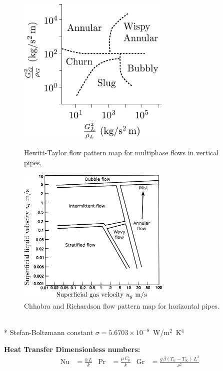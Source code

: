 \begin{datasheet}
\begin{figure}[p!]%
  \begin{center}%
    \includegraphics[width=0.65\textwidth,clip]{figures/Hewitt_Taylor}
  \end{center}
  \caption{Hewitt-Taylor flow pattern map for multiphase flows in
    vertical pipes.}
  \begin{center}%
    \includegraphics[width=0.65\textwidth,clip]{figures/Chhabra_richardson_flow_map}
  \end{center}
  \caption{Chhabra and Richardson flow pattern map for horizontal pipes.}
\end{figure}

\\*
Stefan-Boltzmann constant $\sigma=5.6703\times10^{-8}$~W/m${}^2$~K${}^4$

{\bf Heat Transfer Dimensionless numbers:}
\begin{align*}
  \text{Nu} &= \frac{h\,L}{k} 
  &
  \text{Pr} &= \frac{\mu\,C_p}{k}
  &
  \text{Gr} &= \frac{g\,\beta
    \left(T_w - T_\infty\right)\,L^3}{\nu^2}
\end{align*}


\end{datasheet}
